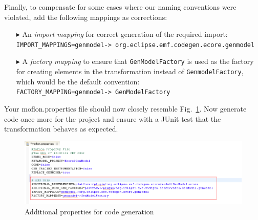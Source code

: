 Finally, to compensate for some cases where our naming conventions were violated, add the following mappings as corrections:

\begin{enumerate}
\item[$\blacktriangleright$] An \emph{import mapping} for correct generation of the required import:\\
\texttt{\tiny IMPORT\_MAPPINGS=genmodel-> org.eclipse.emf.codegen.ecore.genmodel}
\item [$\blacktriangleright$] A \emph{factory mapping} to ensure that \texttt{GenModelFactory} is used as the factory for creating elements in the transformation instead of \texttt{Genmodel\-Factory}, which would be the default convention:\\
\texttt{\tiny FACTORY\_MAPPING=genmodel-> GenModelFactory}
\end{enumerate}

Your \textsf{moflon.properties} file should now closely resemble Fig.~\ref{fig_mofProp}.
Now generate code once more for the project and ensure with a JUnit test that the transformation behaves as expected.

\begin{figure}[htbp]
\begin{center}  \includegraphics[angle=90,height=0.7\textheight]{pics/Ecore2GenModel/9_mofProperties.png}
  \caption{Additional properties for code generation}  
  \label{fig_mofProp}
\end{center}
\end{figure} 

\clearpage




